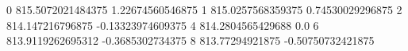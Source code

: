 0 815.5072021484375 1.22674560546875
1 815.0257568359375 0.74530029296875
2 814.147216796875 -0.13323974609375
4 814.2804565429688 0.0
6 813.9119262695312 -0.3685302734375
8 813.77294921875 -0.50750732421875
